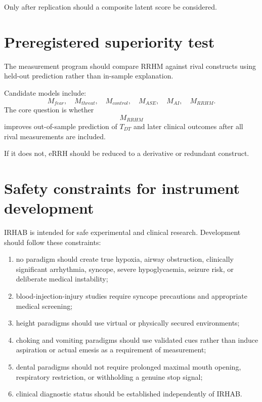 \documentclass[11pt]{article}
\begin{document}
Only after replication should a composite latent score be considered.

\section{Preregistered superiority test}
The measurement program should compare RRHM against rival constructs using held-out prediction rather than in-sample explanation.

Candidate models include:
\[
M_{fear},\quad M_{threat},\quad M_{control},\quad M_{ASE},\quad M_{AI},\quad M_{RRHM}.
\]
The core question is whether
\[
M_{RRHM}
\]
improves out-of-sample prediction of $T_{DT}$ and later clinical outcomes after all rival measurements are included.

If it does not, eRRH should be reduced to a derivative or redundant construct.

\section{Safety constraints for instrument development}
IRHAB is intended for safe experimental and clinical research. Development should follow these constraints:
\begin{enumerate}[leftmargin=2em]
\item no paradigm should create true hypoxia, airway obstruction, clinically significant arrhythmia, syncope, severe hypoglycaemia, seizure risk, or deliberate medical instability;
\item blood-injection-injury studies require syncope precautions and appropriate medical screening;
\item height paradigms should use virtual or physically secured environments;
\item choking and vomiting paradigms should use validated cues rather than induce aspiration or actual emesis as a requirement of measurement;
\item dental paradigms should not require prolonged maximal mouth opening, respiratory restriction, or withholding a genuine stop signal;
\item clinical diagnostic status should be established independently of IRHAB.
\end{enumerate}
\end{document}
